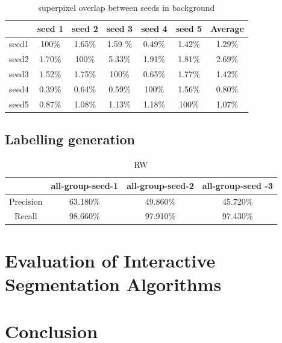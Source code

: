 \documentclass[runningheads,a4paper]{llncs}
\begin{document}
\begin{table}
\centering
\begin{tabular}{|c|c|c|c|c|c|c|}
\hline
 & seed 1 & seed 2&seed 3&seed 4&seed 5&Average\\
\hline
seed1& 100\% & 1.65\% & 1.59	\%& 0.49\%& 1.42\%& 1.29\%\\
\hline
seed2& 1.70\% & 100\% & 5.33\%& 1.91\%& 1.81\%& 2.69\% \\
\hline
seed3& 1.52\% & 1.75\% & 100\%& 0.65\%& 1.77\%& 1.42\% \\
\hline
seed4& 0.39\% & 0.64\% & 0.59\%& 100\%& 1.56\%& 0.80\%\\
\hline
seed5& 0.87\% & 1.08\% & 1.13\%& 1.18\%& 100\%& 1.07\% \\
\hline
\end{tabular}
\caption{superpixel overlap between seeds in background }
\label{ta: sp overlap b}
\end{table} 




\subsection{Labelling generation}


\begin{table}
\centering
\begin{tabular}{|c|c|c|c|}
\hline
& all-group-seed-1 & all-group-seed-2&all-group-seed -3 \\
\hline
Precision& 63.180\% & 49.860\% & 45.720\% \\
\hline
Recall& 98.660\% & 97.910\% & 97.430\%  \\
\hline
\end{tabular}
\caption{RW}
\end{table}

\section{Evaluation of Interactive Segmentation Algorithms}


\section{Conclusion}






\end{document}
